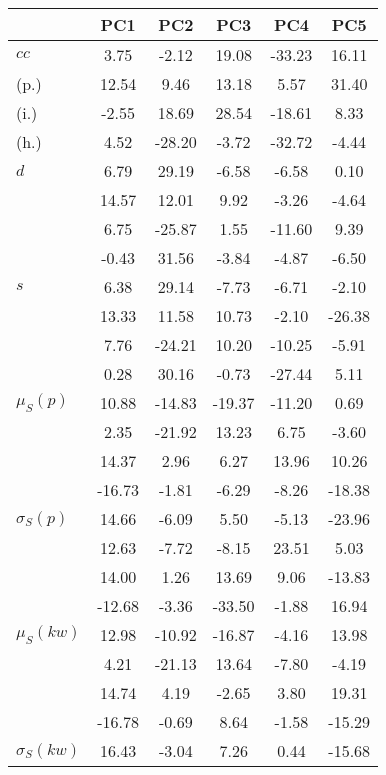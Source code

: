 \begin{table}[h!]
\begin{center}
\begin{tabular}{| l | c | c | c | c | c |}\hline
 & PC1 & PC2 & PC3 & PC4 & PC5 \\\hline
$cc$ & 3.75  & -2.12  & 19.08  & -33.23  & 16.11 \\\hline
(p.) & 12.54  & 9.46  & 13.18  & 5.57  & 31.40 \\\hline
(i.) & -2.55  & 18.69  & 28.54  & -18.61  & 8.33 \\\hline
(h.) & 4.52  & -28.20  & -3.72  & -32.72  & -4.44 \\\hline
$d$ & 6.79  & 29.19  & -6.58  & -6.58  & 0.10 \\\hline
 & 14.57  & 12.01  & 9.92  & -3.26  & -4.64 \\\hline
 & 6.75  & -25.87  & 1.55  & -11.60  & 9.39 \\\hline
 & -0.43  & 31.56  & -3.84  & -4.87  & -6.50 \\\hline
$s$ & 6.38  & 29.14  & -7.73  & -6.71  & -2.10 \\\hline
 & 13.33  & 11.58  & 10.73  & -2.10  & -26.38 \\\hline
 & 7.76  & -24.21  & 10.20  & -10.25  & -5.91 \\\hline
 & 0.28  & 30.16  & -0.73  & -27.44  & 5.11 \\\hline
$\mu_S(p)$ & 10.88  & -14.83  & -19.37  & -11.20  & 0.69 \\\hline
 & 2.35  & -21.92  & 13.23  & 6.75  & -3.60 \\\hline
 & 14.37  & 2.96  & 6.27  & 13.96  & 10.26 \\\hline
 & -16.73  & -1.81  & -6.29  & -8.26  & -18.38 \\\hline
$\sigma_S(p)$ & 14.66  & -6.09  & 5.50  & -5.13  & -23.96 \\\hline
 & 12.63  & -7.72  & -8.15  & 23.51  & 5.03 \\\hline
 & 14.00  & 1.26  & 13.69  & 9.06  & -13.83 \\\hline
 & -12.68  & -3.36  & -33.50  & -1.88  & 16.94 \\\hline
$\mu_S(kw)$ & 12.98  & -10.92  & -16.87  & -4.16  & 13.98 \\\hline
 & 4.21  & -21.13  & 13.64  & -7.80  & -4.19 \\\hline
 & 14.74  & 4.19  & -2.65  & 3.80  & 19.31 \\\hline
 & -16.78  & -0.69  & 8.64  & -1.58  & -15.29 \\\hline
$\sigma_S(kw)$ & 16.43  & -3.04  & 7.26  & 0.44  & -15.68 \\\hline

\end{tabular}
\end{center}
\end{table}
